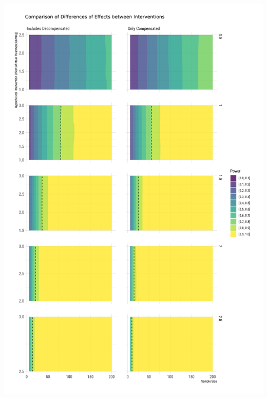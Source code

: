 \documentclass[
]{article}
\begin{document}
\includegraphics{figures/unnamed-chunk-78-1.png}
\end{document}
